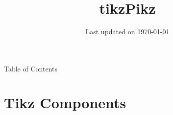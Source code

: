\documentclass[9pt,svgnames,x11names]{beamer}
\title[\color{black} tikz\textcolor{staticsRed}{\;2018-\the\year}]{\Huge tikzPikz}
\subtitle{} %
\institute{\small Source code at: \lb{\footnotesize\url{https://github.com/dmorgorg/LaTeX2022}}}
\author{} %
\date{\small Last updated on \today}
\begin{document}

\begin{frame}[plain]
    \titlepage
\end{frame}


\begin{frame}{Table of Contents}
    \begin{minipage}{0.9\textwidth}
        \tableofcontents
    \end{minipage}
    \vfill

\end{frame}


\section{Tikz Components}


\end{document}
